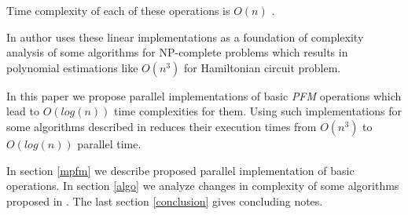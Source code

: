 


Time complexity of each of these operations is $O(n)$ \cite{Amos:1997, Katsanyi:2003}.

In \cite{Katsanyi:2003} author uses these linear implementations as a foundation of complexity analysis of some algorithms for NP-complete problems which results in polynomial estimations like $O(n^3)$ for Hamiltonian circuit problem.

In this paper we propose parallel implementations of basic \emph{PFM} operations which lead to $O(log(n))$ time complexities for them. Using such implementations for some algorithms described in \cite{Katsanyi:2003} reduces their execution times from $O(n^3)$ to $O(log(n))$ parallel time.

In section \ref{mpfm} we describe proposed parallel implementation of basic operations. In section \ref{algo} we analyze changes in complexity of some algorithms proposed in \cite{Katsanyi:2003}. The last section \ref{conclusion} gives concluding notes.